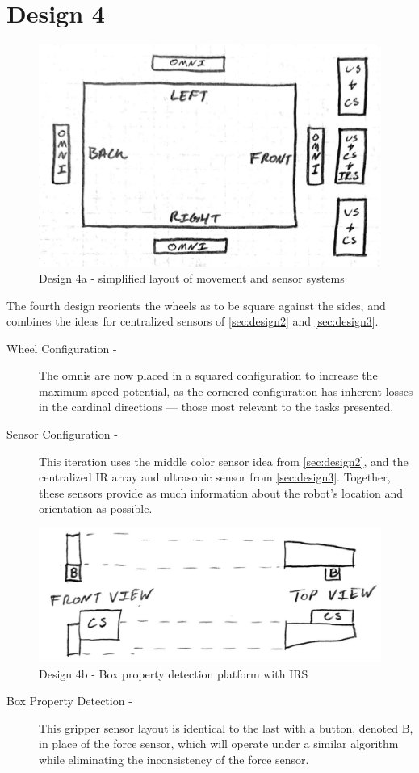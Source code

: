 \documentclass[11pt]{report}
\begin{document}
\newpage
\section{Design 4}\label{sec:design4}
\begin{figure}[H]
    \centering
    \includegraphics[width=0.5\linewidth]{Images//Designs/Design4a.pdf}
    \caption{Design 4a - simplified layout of movement and sensor systems}
    \label{fig:design4a}
\end{figure}
The fourth design reorients the wheels as to be square against the sides, and combines the ideas for centralized sensors of \cref{sec:design2} and \cref{sec:design3}.
\begin{description}
    \item[Wheel Configuration - ]The \glspl{omni} are now placed in a squared configuration to increase the maximum speed potential, as the cornered configuration has inherent losses in the cardinal directions --- those most relevant to the tasks presented.
    \item[Sensor Configuration - ]This iteration uses the middle color sensor idea from \cref{sec:design2}, and the centralized \gls{IR} array and ultrasonic sensor from \cref{sec:design3}. Together, these sensors provide as much information about the robot's location and orientation as possible.
\end{description}
\begin{figure}[H]
    \centering
    \includegraphics[width=0.5\linewidth]{Images//Designs/Design4b.pdf}
    \caption{Design 4b - Box property detection platform with \gls{IRS}}
    \label{fig:design4b}
\end{figure}
\begin{description}
    \item[Box Property Detection - ]This gripper sensor layout is identical to the last with a button, denoted \gls{B}, in place of the force sensor, which will operate under a similar algorithm while eliminating the inconsistency of the force sensor.
\end{description}
\end{document}
